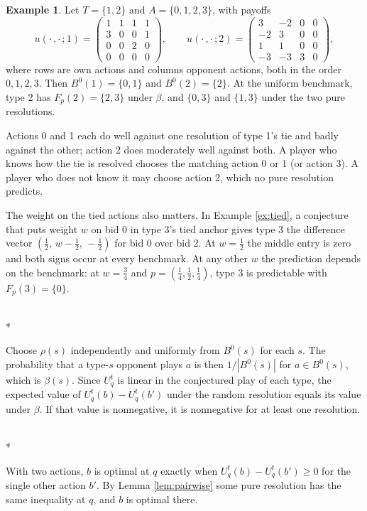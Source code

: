 \documentclass[12pt]{article}
\makeatletter
\theoremstyle{definition}
\newtheorem{example}{Example}
\renewenvironment{proof}[1][\proofname]{\par
  \pushQED{\qed}%
  \normalfont \topsep6\p@\@plus6\p@\relax
  \trivlist
  \item[\hskip\labelsep\itshape #1\@addpunct{.}]\mbox{}\\*
  \ignorespaces
}{%
  \popQED\endtrivlist\@endpefalse
}
\makeatother
\begin{document}
\begin{example}\label{ex:hedge}
Let $T = \{1, 2\}$ and $A = \{0, 1, 2, 3\}$, with payoffs
\[
u(\cdot\,, \cdot\,; 1) = \begin{pmatrix} 1&1&1&1 \\ 3&0&0&1 \\ 0&0&2&0 \\ 0&0&0&0 \end{pmatrix},
\qquad
u(\cdot\,, \cdot\,; 2) = \begin{pmatrix} 3&-2&0&0 \\ -2&3&0&0 \\ 1&1&0&0 \\ -3&-3&3&0 \end{pmatrix},
\]
where rows are own actions and columns opponent actions, both in the order $0,1,2,3$. Then $B^0(1) = \{0,1\}$ and $B^0(2) = \{2\}$. At the uniform benchmark, type 2 has $F_p(2) = \{2, 3\}$ under $\beta$, and $\{0, 3\}$ and $\{1, 3\}$ under the two pure resolutions.
\end{example}

Actions 0 and 1 each do well against one resolution of type 1's tie and badly against the other; action 2 does moderately well against both. A player who knows how the tie is resolved chooses the matching action 0 or 1 (or action 3). A player who does not know it may choose action 2, which no pure resolution predicts.

The weight on the tied actions also matters. In Example \ref{ex:tied}, a conjecture that puts weight $w$ on bid 0 in type 3's tied anchor gives type 3 the difference vector $(\tfrac12,\, w - \tfrac12,\, -\tfrac12)$ for bid 0 over bid 2. At $w = \tfrac12$ the middle entry is zero and both signs occur at every benchmark. At any other $w$ the prediction depends on the benchmark: at $w = \tfrac34$ and $p = (\tfrac14, \tfrac12, \tfrac14)$, type 3 is predictable with $F_p(3) = \{0\}$.

\begin{proof}[Proof of Lemma \ref{lem:pairwise}]
Choose $\rho(s)$ independently and uniformly from $B^0(s)$ for each $s$. The probability that a type-$s$ opponent plays $a$ is then $1/|B^0(s)|$ for $a \in B^0(s)$, which is $\beta(s)$. Since $U^t_q$ is linear in the conjectured play of each type, the expected value of $U^t_q(b) - U^t_q(b')$ under the random resolution equals its value under $\beta$. If that value is nonnegative, it is nonnegative for at least one resolution.
\end{proof}

\begin{proof}[Proof of Corollary \ref{cor:binary}]
With two actions, $b$ is optimal at $q$ exactly when $U^t_q(b) - U^t_q(b') \ge 0$ for the single other action $b'$. By Lemma \ref{lem:pairwise} some pure resolution has the same inequality at $q$, and $b$ is optimal there.
\end{proof}


\end{document}
